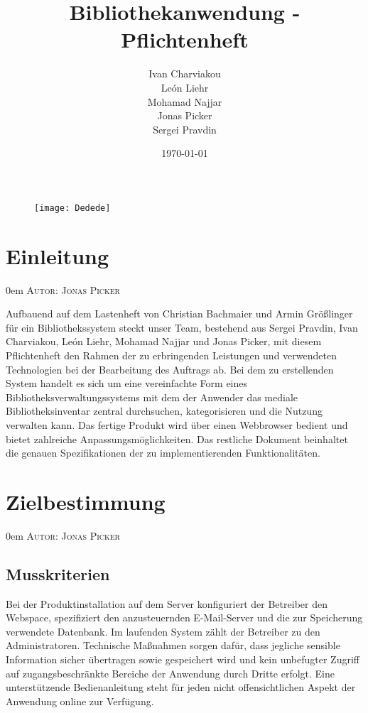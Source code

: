 \documentclass{article}
\title{Bibliothekanwendung - Pflichtenheft}
\date{\today}
\author{
	Ivan Charviakou\\
	León Liehr\\
	Mohamad Najjar\\
	Jonas Picker\\
	Sergei Pravdin
}
\makeatletter
\newcommand{\sectionauthor}[1]{
	{\parindent 0em \large \scshape Autor: #1 \par \nobreak \vspace*{2em}}
	\@afterheading
}
\makeatother
\begin{document}
\maketitle
\begin{figure}[h]
	\centering
	\texttt{[image: Dedede]}
\end{figure}
\newpage

\tableofcontents
\newpage

\section{Einleitung} %
\sectionauthor{Jonas Picker}
Aufbauend auf dem Lastenheft von Christian Bachmaier und Armin Größlinger für ein Bibliothekssystem steckt unser Team, bestehend aus Sergei Pravdin, Ivan Charviakou, León Liehr, Mohamad Najjar und Jonas Picker, mit diesem Pflichtenheft den Rahmen der zu erbringenden Leistungen und verwendeten Technologien bei der Bearbeitung des Auftrags ab. Bei dem zu erstellenden System handelt es sich um eine vereinfachte Form eines Bibliotheksverwaltungssystems mit dem der Anwender das mediale Bibliotheksinventar zentral durchsuchen, kategorisieren und die Nutzung verwalten kann. Das fertige Produkt wird über einen Webbrowser bedient und bietet zahlreiche Anpassungsmöglichkeiten. Das restliche Dokument beinhaltet die genauen Spezifikationen der zu implementierenden Funktionalitäten.
\newpage

\section{Zielbestimmung} %
\sectionauthor{Jonas Picker}

\subsection{Musskriterien}
Bei der Produktinstallation auf dem Server konfiguriert der Betreiber den Webspace, spezifiziert den anzusteuernden E-Mail-Server und die zur Speicherung verwendete Datenbank. Im laufenden System zählt der Betreiber zu den Administratoren. Technische Maßnahmen sorgen dafür, dass jegliche sensible Information sicher übertragen sowie gespeichert wird und kein unbefugter Zugriff auf zugangsbeschränkte Bereiche der Anwendung durch Dritte erfolgt. Eine unterstützende Bedienanleitung steht für jeden nicht offensichtlichen Aspekt der Anwendung online zur Verfügung.
\end{document}

